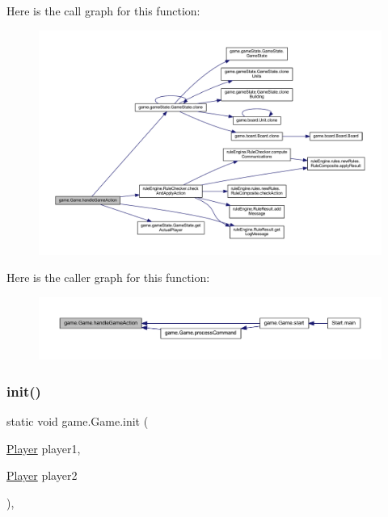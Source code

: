 Here is the call graph for this function\+:
\nopagebreak
\begin{figure}[H]
\begin{center}
\leavevmode
\includegraphics[width=350pt]{classgame_1_1_game_a1847ff6b22bd747cc2983a261a79aed2_cgraph}
\end{center}
\end{figure}
Here is the caller graph for this function\+:
\nopagebreak
\begin{figure}[H]
\begin{center}
\leavevmode
\includegraphics[width=350pt]{classgame_1_1_game_a1847ff6b22bd747cc2983a261a79aed2_icgraph}
\end{center}
\end{figure}
\mbox{\label{classgame_1_1_game_ab06907ac42599c20175756897f58db82}} 
\subsubsection{\texorpdfstring{init()}{init()}}
{\footnotesize\ttfamily static void game.\+Game.\+init (\begin{DoxyParamCaption}\item[{\mbox{\hyperlink{interfaceplayer_1_1_player}{Player}}}]{player1,  }\item[{\mbox{\hyperlink{interfaceplayer_1_1_player}{Player}}}]{player2 }\end{DoxyParamCaption})\hspace{0.3cm}{\ttfamily [inline]}, {\ttfamily [static]}}

